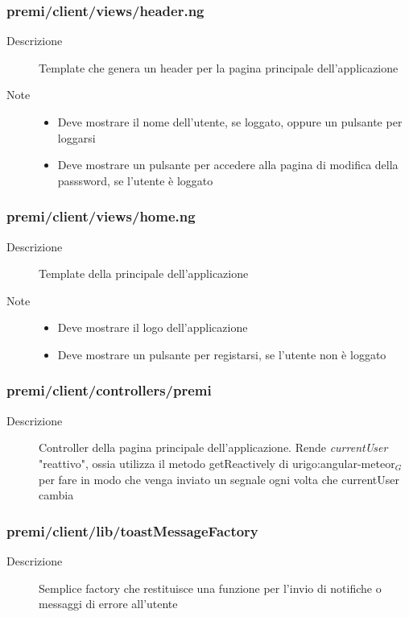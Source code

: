 \subsubsection{premi/client/views/header.ng}

\begin{description}
\item[Descrizione] \hfill
	Template che genera un header per la pagina principale dell'applicazione
	\item[Note] \hfill
	\begin{itemize}
			\item Deve mostrare il nome dell'utente, se loggato, oppure un pulsante per loggarsi
			\item Deve mostrare un pulsante per accedere alla pagina di modifica della passsword, se l'utente è loggato
	\end{itemize}
\end{description}

\subsubsection{premi/client/views/home.ng}

\begin{description}
\item[Descrizione] \hfill
	Template della principale dell'applicazione
	\item[Note] \hfill
	\begin{itemize}
			\item Deve mostrare il logo dell'applicazione
			\item Deve mostrare un pulsante per registarsi, se l'utente non è loggato
	\end{itemize}
\end{description}

\subsubsection{premi/client/controllers/premi}

\begin{description}
\item[Descrizione] \hfill
	Controller della pagina principale dell'applicazione. Rende \textit{currentUser} "reattivo", ossia utilizza il metodo getReactively di urigo:angular-meteor$_G$ per fare in modo che venga inviato un segnale ogni volta che currentUser cambia
\end{description}

\subsubsection{premi/client/lib/toastMessageFactory}

\begin{description}
\item[Descrizione] \hfill
	Semplice factory che restituisce una funzione per l'invio di notifiche o messaggi di errore all'utente
\end{description}

